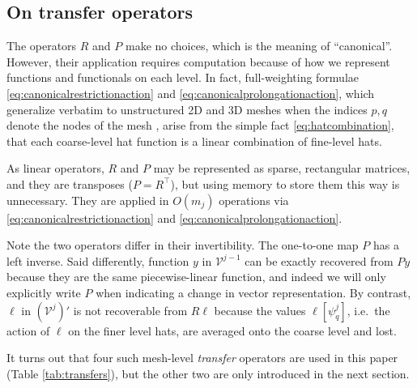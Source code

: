 \documentclass[letterpaper,final,12pt,reqno]{amsart}
\theoremstyle{claim}
\numberwithin{equation}{section}
\numberwithin{figure}{section}
\numberwithin{table}{section}
\numberwithin{theorem}{section}
\begin{document}
\subsection*{On transfer operators}  The operators $R$ and $P$ make no choices, which is the meaning of ``canonical''.  However, their application requires computation because of how we represent functions and functionals on each level.  In fact, full-weighting formulae \eqref{eq:canonicalrestrictionaction} and \eqref{eq:canonicalprolongationaction}, which generalize verbatim to unstructured 2D and 3D meshes when the indices $p,q$ denote the nodes of the mesh \cite[Chapter V]{Braess2007}, arise from the simple fact \eqref{eq:hatcombination}, that each coarse-level hat function is a linear combination of fine-level hats.

As linear operators, $R$ and $P$ may be represented as sparse, rectangular matrices, and they are transposes ($P=R^\top$), but using memory to store them this way is unnecessary.  They are applied in $O(m_j)$ operations via \eqref{eq:canonicalrestrictionaction} and \eqref{eq:canonicalprolongationaction}.

Note the two operators differ in their invertibility.  The one-to-one map $P$ has a left inverse.  Said differently, function $y$ in $\mathcal{V}^{j-1}$ can be exactly recovered from $Py$ because they are the same piecewise-linear function, and indeed we will only explicitly write $P$ when indicating a change in vector representation.  By contrast, $\ell$ in $(\mathcal{V}^j)'$ is not recoverable from $R\ell$ because the values $\ell[\psi_q^j]$, i.e.~the action of $\ell$ on the finer level hats, are averaged onto the coarse level and lost.

It turns out that four such mesh-level \emph{transfer} operators are used in this paper (Table \ref{tab:transfers}), but the other two are only introduced in the next section.
\end{document}
